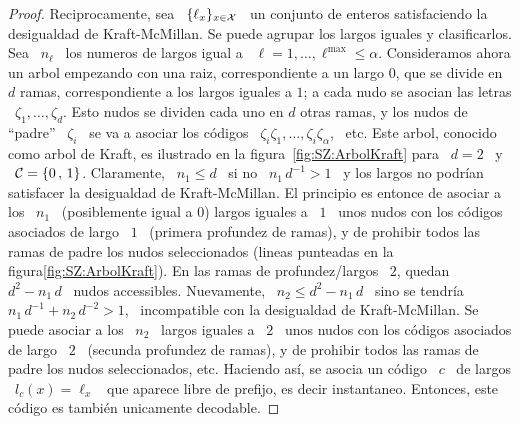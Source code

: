 \begin{proof}
  Reciprocamente,  sea \  $\{ \ell_x  \}_{x \in  \mathcal{X}}$ \  un conjunto  de enteros
  satisfaciendo la  desigualdad de Kraft-McMillan.  Se puede  agrupar los largos
  iguales y  clasificarlos. Sea  \ $n_\ell$ \  los numeros  de largos igual  a \
  $\ell =  1 , \ldots  , \ell^{\max} \le  \alpha$.  Consideramos ahora  un arbol
  empezando con una  raiz, correspondiente a un largo $0$, que  se divide en $d$
  ramas, correspondiente a los largos iguales  a $1$; a cada nudo se asocian las
  letras \  $\zeta_1, \ldots , \zeta_d$. Esto  nudos se dividen cada  uno en $d$
  otras  ramas, y  los nudos  de ``padre''  \ $\zeta_i$  \ se  va a  asociar los
  c\'odigos \  $\zeta_i \zeta_1  , \ldots ,  \zeta_i \zeta_\alpha$, \  etc. Este
  arbol,    conocido   como    arbol   de    Kraft,   es    ilustrado    en   la
  figura~\ref{fig:SZ:ArbolKraft}  para \ $d  = 2$  \ y  \ $\mathcal{C}  = \{0  \, ,  \, 1
  \}$. Claramente, \ $n_1 \le d$ \ si no \ $n_1 \, d^{-1} > 1$ \ y los largos no
  podr\'ian  satisfacer  la  desigualdad  de Kraft-McMillan.   El  principio  es
  entonce de asociar a los \ $n_1$ \ (posiblemente igual a 0) largos iguales a \
  $1$  \ unos  nudos  con los  c\'odigos asociados  de  largo \  $1$ \  (primera
  profundez  de  ramas), y  de  prohibir  todos las  ramas  de  padre los  nudos
  seleccionados (lineas  punteadas en la  figura\ref{fig:SZ:ArbolKraft}). En las
  ramas  de  profundez/largos  \  $2$,  quedan  \  $d^2 -  n_1  \,  d$  \  nudos
  accessibles.  Nuevamente,  \ $n_2 \le d^2  - n_1 \,  d$ \ sino se  tendr\'ia \
  $n_1 \,  d^{-1} + n_2  \, d^{-2}  > 1$, \  incompatible con la  desigualdad de
  Kraft-McMillan. Se puede asociar a los \ $n_2$ \ largos iguales a \ $2$ \ unos
  nudos  con los  c\'odigos asociados  de largo  \ $2$  \ (secunda  profundez de
  ramas),  y de  prohibir  todos las  ramas  de padre  los nudos  seleccionados,
  etc. Haciendo  as\'i, se  asocia un  c\'odigo \ $c$  \ de  largos \  $l_c(x) =
  \ell_x$ \ que aparece libre  de prefijo, es decir instantaneo.  Entonces, este
  c\'odigo es tambi\'en unicamente decodable.
\end{proof}

